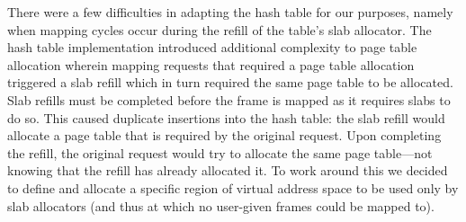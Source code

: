 There were a few difficulties in adapting the hash table for our purposes, namely when mapping cycles occur during the refill of the table's slab allocator. The hash table implementation introduced additional complexity to page table allocation wherein mapping requests that required a page table allocation triggered a slab refill which in turn required the same page table to be allocated. Slab refills must be completed before the frame is mapped as it requires slabs to do so. This caused duplicate insertions into the hash table: the slab refill would allocate a page table that is required by the original request. Upon completing the refill, the original request would try to allocate the same page table---not knowing that the refill has already allocated it. To work around this we decided to define and allocate a specific region of virtual address space to be used only by slab allocators (and thus at which no user-given frames could be mapped to).

